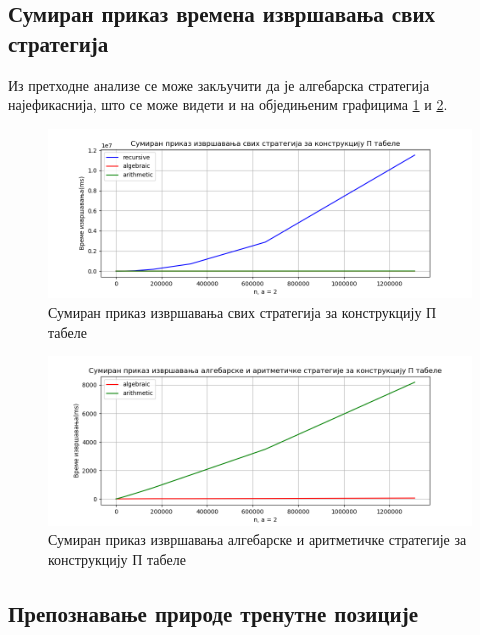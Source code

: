 \documentclass[a4paper]{article}
\begin{document}
\subsection{Сумиран приказ времена извршавања свих стратегија}

Из претходне анализе се може закључити да је алгебарска стратегија најефикаснија, што се може видети и на обједињеним графицима \ref{fig:all} и  \ref{fig:algebraicVSarithmetic}.

\begin{figure}[H]
	\caption{Сумиран приказ извршавања свих стратегија за конструкцију П табеле}
	\label{fig:all}
	\begin{center}
		\includegraphics[width=\textwidth]{all.png}
	\end{center}
\end{figure}

\begin{figure}[H]
	\caption{Сумиран приказ извршавања алгебарске и аритметичке стратегије за конструкцију П табеле}
	\label{fig:algebraicVSarithmetic}
	\begin{center}
		\includegraphics[width=\textwidth]{algebraicVSarithmetic.png}
	\end{center}
\end{figure}

\subsection{Препознавање природе тренутне позиције}
\end{document}
